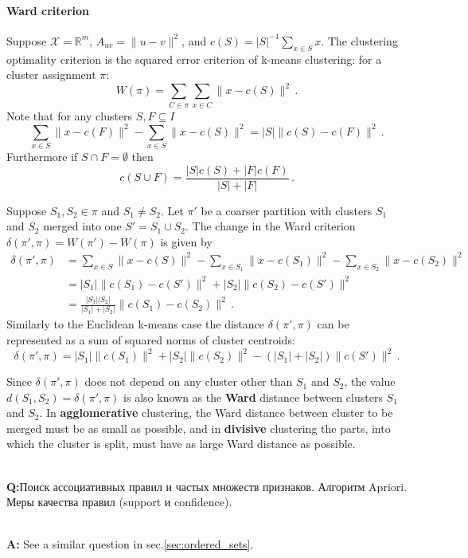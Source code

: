 \documentclass[a4paper,14pt]{extarticle}
\newcommand{\Real}{\mathbb{R}}
\newcommand{\rus}[1]{\foreignlanguage{russian}{#1}}
\begin{document}
\paragraph{Ward criterion} %
\label{par:ward_criterion}

Suppose $\mathcal{X} = \Real^m$, $A_{uv} = \|u-v\|^2$, and $c(S) = |S|^{-1} \sum_{x\in S} x$.
The clustering optimality criterion is the squared error criterion of k-means clustering:
for a cluster assignment $\pi$:
$$ W(\pi) = \sum_{C\in \pi} \sum_{x\in C} \|x - c(S)\|^2 \,. $$
Note that for any clusters $S, F\subseteq I$
$$ \sum_{x\in S} \|x - c(F)\|^2 - \sum_{x \in S} \|x - c(S)\|^2
    = |S| \|c(S) - c(F)\|^2 \,. $$
Furthermore if $S \cap F =\emptyset$ then
$$ c(S\cup F) = \frac{|S| c(S) + |F| c(F)}{|S|+|F|} \,. $$

Suppose $S_1, S_2\in \pi$ and $S_1\neq S_2$. Let $\pi'$ be a coarser partition with
clusters $S_1$ and $S_2$ merged into one $S' = S_1\cup S_2$. The change in the Ward
criterion $\delta(\pi',\pi) = W(\pi') - W(\pi)$ is given by
\begin{align*}
    \delta(\pi',\pi)
    &= \sum_{x\in S} \|x - c(S)\|^2 - \sum_{x\in S_1} \|x - c(S_1)\|^2
     - \sum_{x\in S_2} \|x - c(S_2)\|^2\\
    &= |S_1| \|c(S_1) - c(S')\|^2 + |S_2| \|c(S_2) - c(S')\|^2 \\
    &= \frac{|S_1| |S_2|}{|S_1| + |S_2|} \|c(S_1) - c(S_2)\|^2 \,.
\end{align*}
Similarly to the Euclidean k-means case the distance $\delta(\pi',\pi)$ can be represented
as a sum of squared norms of cluster centroids:
$$ \delta(\pi',\pi)
    = |S_1|\|c(S_1)\|^2 + |S_2|\|c(S_2)\|^2
    - (|S_1|+|S_2|)\|c(S')\|^2
    \,. $$

Since $\delta(\pi',\pi)$ does not depend on any cluster other than $S_1$ and $S_2$, the
value $d(S_1, S_2) = \delta(\pi',\pi)$ is also known as the \textbf{Ward} distance between
clusters $S_1$ and $S_2$. In \textbf{agglomerative} clustering, the Ward distance between
cluster to be merged must be as small as possible, and in \textbf{divisive} clustering
the parts, into which the cluster is split, must have as large Ward distance as possible.


\hfill\\\textbf{Q:}\rus{Поиск ассоциативных правил и частых множеств признаков.
Алгоритм Apriori. Меры качества правил (support и confidence).}

\hfill\\\textbf{A:}
See a similar question in sec.\ref{sec:ordered_sets}.
\end{document}
